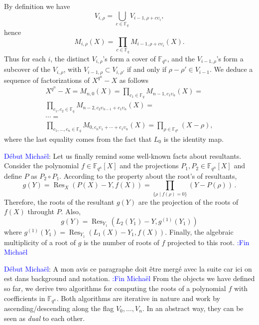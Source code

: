 \documentclass{sig-alternate}
\newcommand{\ff}[1]{\mathbb{F}_{#1}}
\newcommand{\qq}{q}
\newcommand{\nn}{n}
\newcommand{\qn}{{\qq^\nn}}
\newcommand{\basef}{\ff{\qq}}
\newcommand{\extf}{\ff{\qn}}
\DeclareMathOperator{\Res}{Res}
\newcounter{algo}
\newcommand{\comd}{\noindent \textcolor{blue}{D\'ebut Micha\"el}:}
\newcommand{\comf}{\noindent \textcolor{blue}{:Fin Micha\"el}}
\renewcommand{\paragraph}[1]{\smallskip\noindent{{\bf \rm #1.}}}
\begin{document}
By definition we have
\begin{equation}
  V_{i,\rho} = \bigcup_{c\in\basef} V_{i-1,\rho + c\upsilon_i},
\end{equation}
hence
\begin{equation}
  M_{i,\rho}(X) = \prod_{c\in\basef} M_{i-1,\rho+c\upsilon_i}(X).
\end{equation}
Thus for each $i$, the distinct $V_{i,\rho}$'s form a cover of
$\extf$, and the $V_{i-1,\rho}$'s form a subcover of the $V_{i,\rho}$,
with $V_{i-1,\rho}\subset V_{i,\rho'}$ if and only if $\rho-\rho'\in
V_{i-1}$.  We deduce a sequence of factorizations of $X^\qn-X$ as
follows
\begin{equation}
  \label{eq:product-tree}
  \begin{gathered}
    X^\qn-X = M_{n,0}(X) =
    \prod_{c_1\in\basef}M_{n-1,c_1\upsilon_n}(X)=\\
    \prod_{c_1,c_2\in\basef}M_{n-2,c_2\upsilon_{n-1}+c_1\upsilon_n}(X)=\\
    \cdots=\\
    \prod_{c_1,\dots,c_n\in\basef}M_{0,c_n\upsilon_1+\cdots+c_1\upsilon_n}(X)=
    \prod_{\rho\in\extf}(X-\rho),
  \end{gathered}
\end{equation}
where the last equality comes from the fact that $L_0$ is the identity
map.

\comd
Let us finally remind some well-known facts about resultants.
Consider the polynomial $f \in \extf[X]$ and the projections $P_1, P_2 \in  \extf[X]$ and define $P$ as $P_2 \circ P_1$.
According to the property about the root's of resultants,
$$g(Y)=\Res_X(P(X)-Y,f(X))=\prod_{\{\rho \mid f(\rho)=0\}} (Y-P(\rho)) \,.$$
Therefore, the roots of the resultant $g(Y)$ are the projection of the roots of $f(X)$ throught $P$.
Also, 
\begin{equation}
\label{resultant_compose}
g(Y)=\Res_{Y_1}(L_2(Y_1)-Y,g^{(1)}(Y_1))
\end{equation}
 where $g^{(1)}(Y_1)=\Res_{Y_1}(L_1(X)-Y_1,f(X))$. Finally, 
 the algebraic multiplicity of a root of $g$ is the number of roots of $f$ projected to this root.
\comf

\comd
A mon avis ce paragraphe doit \^etre merg\'e avec la suite car ici on est dans background and notation.
\comf
\paragraph{Application to root finding} From the objects we have
defined so far, we derive two algorithms for computing the roots of a
polynomial $f$ with coefficients in $\extf$. Both algorithms are
iterative in nature and work by ascending/de\-scend\-ing along the
flag $V_0,\dots,V_n$. In an abstract way, they can be seen as
\emph{dual} to each other.
\end{document}
